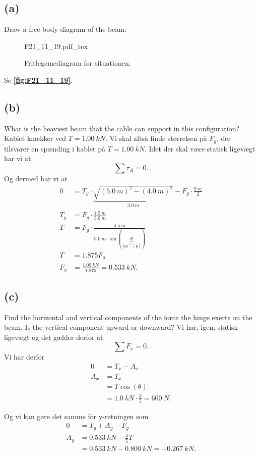 \documentclass[12pt]{article}
\newcommand{\incfig}[2][1]{%
  \def\svgwidth{#1\columnwidth}
  {#2.pdf_tex}
}
\theoremstyle{definition}
\begin{document}
\subsection*{(a)}
Draw a free-body diagram of the beam.
\bigbreak
\begin{figure}[ht]
  \centering
  \incfig[0.8]{F21_11_19}
  \caption{Fritlegemediagram for situationen.}
  \label{fig:F21_11_19}
\end{figure}

Se \textbf{\autoref{fig:F21_11_19}}.

\subsection*{(b)}
What is the heaviest beam that the cable can support in this configuration?
\bigbreak
Kablet knækker ved $T = \qty{1,00}{kN}$. Vi skal altså finde størrelsen på $F_g$, der tilsvarer en spænding i kablet på $T = \qty{1,00}{kN}$. Idet der skal være statisk ligevægt har vi at
\[ 
\sum \tau_A = 0
.\]
Og dermed har vi at
\begin{align*}
  0 &= T_y \cdot \underbrace{\sqrt{(\qty{5,0}{m})^2 - (\qty{4,0}{m})^2}}_{\qty{3,0}{m}} - F_g \cdot \frac{\qty{9}{m}}{2} \\
  T_y &= F_g \cdot \frac{\qty{4,5}{m}}{\qty{3,0}{m}} \\
  T &=  F_g \cdot \frac{\qty{4,5}{m}}{\qty{3,0}{m} \cdot \sin(\underbrace{\theta}_{\tan^{-1} \left( \frac{4}{3} \right)})} \\
  T &= \num{1,875} F_g \\
  F_g &= \frac{\qty{1,00}{kN}}{\num{1,875}} = \qty{0.533}{kN} 
.\end{align*}


\subsection*{(c)}
Find the horizontal and vertical components of the force the hinge exerts on the beam. Is the vertical component upward or downward?
\bigbreak
Vi har, igen, statisk ligevægt og det gælder derfor at
\[ 
\sum F_x = 0
.\]
Vi har derfor
\begin{align*}
  0 &= T_x - A_x \\
  A_x &= T_x \\
  &= T \cos(\theta)  \\
  &= \qty{1,0}{kN} \cdot \frac{3}{5} = \qty{600}{N} 
.\end{align*}

Og vi kan gøre det samme for y-retningen som
\begin{align*}
  0 &= T_y + A_y - F_g \\
  A_y &= \qty{0.533}{kN} - \frac{4}{5}T \\
  &= \qty{0,533}{kN} - \qty{0,800}{kN} = \qty{-0.267}{kN}
.\end{align*}
\end{document}
